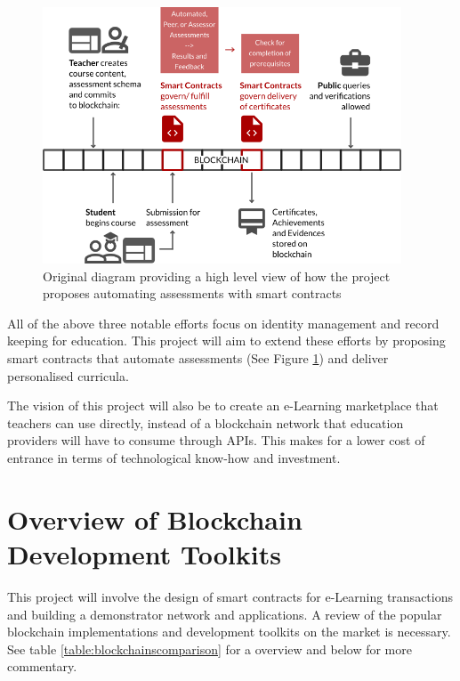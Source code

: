 \begin{figure}[!ht] 
    \centering    
    \includegraphics[width=0.95\textwidth]{moocon}
    \caption[Assessment Smart Contracts Concept]
        {Original diagram providing a high level view of how the project proposes automating assessments 
        with smart contracts}
    \label{fig:moocon_assess}
\end{figure}

All of the above three notable efforts focus on identity management and record keeping for education. 
This project will aim to extend these efforts by proposing smart contracts that automate assessments 
(See Figure \ref{fig:moocon_assess}) and deliver personalised curricula. 

The vision of this project will also be to create an e-Learning marketplace that teachers can use directly, 
instead of a blockchain network that education providers will have to consume through APIs. This makes for a 
lower cost of entrance in terms of technological know-how and investment.

\section{Overview of Blockchain Development Toolkits}

This project will involve the design of smart contracts for e-Learning transactions and building a demonstrator 
network and applications. A review of the popular blockchain implementations and development toolkits on the 
market is necessary. See table \ref{table:blockchainscomparison} for a overview and below for more commentary.

